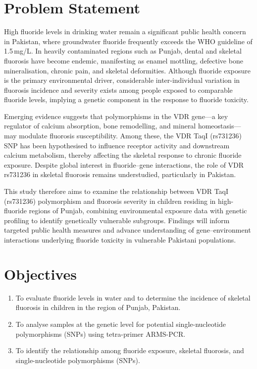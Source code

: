 \documentclass[12pt,a4paper]{article}
\begin{document}
\section{Problem Statement}

High fluoride levels in drinking water remain a significant public health concern in Pakistan, where
groundwater fluoride frequently exceeds the WHO guideline of 1.5\,mg/L. In heavily contaminated
regions such as Punjab, dental and skeletal fluorosis have become endemic, manifesting as enamel
mottling, defective bone mineralisation, chronic pain, and skeletal deformities. Although fluoride
exposure is the primary environmental driver, considerable inter-individual variation in fluorosis
incidence and severity exists among people exposed to comparable fluoride levels, implying a genetic
component in the response to fluoride toxicity.

Emerging evidence suggests that polymorphisms in the VDR gene---a key regulator of calcium
absorption, bone remodelling, and mineral homeostasis---may modulate fluorosis susceptibility.
Among these, the VDR TaqI (rs731236) SNP has been hypothesised to influence receptor activity
and downstream calcium metabolism, thereby affecting the skeletal response to chronic fluoride
exposure. Despite global interest in fluoride–gene interactions, the role of VDR rs731236 in
skeletal fluorosis remains understudied, particularly in Pakistan.

This study therefore aims to examine the relationship between VDR TaqI (rs731236) polymorphism
and fluorosis severity in children residing in high-fluoride regions of Punjab, combining
environmental exposure data with genetic profiling to identify genetically vulnerable subgroups.
Findings will inform targeted public health measures and advance understanding of gene–environment
interactions underlying fluoride toxicity in vulnerable Pakistani populations.

\section{Objectives}

\begin{enumerate}[label=\textbullet]
\item To evaluate fluoride levels in water and to determine the incidence of skeletal fluorosis in
      children in the region of Punjab, Pakistan.
\item To analyse samples at the genetic level for potential single-nucleotide polymorphisms (SNPs)
      using tetra-primer ARMS-PCR.
\item To identify the relationship among fluoride exposure, skeletal fluorosis, and single-nucleotide
      polymorphisms (SNPs).
\end{enumerate}
\end{document}
